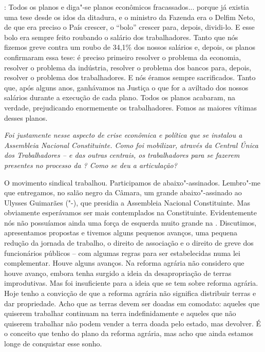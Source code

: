 : Todos os planos e diga"-se planos econômicos
fracassados... porque já existia uma tese desde os idos da ditadura, e o
ministro da Fazenda era o Delfim Neto, de que era preciso o País
crescer, o ``bolo'' crescer para, depois, dividi-lo. E esse bolo era
sempre feito roubando o salário dos trabalhadores. Tanto que nós fizemos
greve contra um roubo de 34,1\% dos nossos salários e, depois, os planos
confirmaram essa tese: é preciso primeiro resolver o problema da
economia, resolver o problema da indústria, resolver o problema dos
bancos para, depois, resolver o problema dos trabalhadores. E nós éramos
sempre sacrificados. Tanto que, após alguns anos, ganhávamos na Justiça
o que for a aviltado dos nossos salários durante a execução de cada
plano. Todos os planos acabaram, na verdade, prejudicando enormemente os
trabalhadores. Fomos as maiores vítimas desses planos.

\medskip

\noindent\emph{Foi justamente nesse aspecto de crise econômica e política que
se instalou a Assembleia Nacional Constituinte. Como foi mobilizar,
através da Central Única dos Trabalhadores --  e das outras centrais,
os trabalhadores para se fazerem presentes no processo da ? Como se
deu a articulação?}

O movimento sindical trabalhou. Participamos de
abaixo"-assinados. Lembro"-me que entregamos, no salão negro da Câmara, um
grande abaixo"-assinado ao Ulysses Guimarães ("-), que presidia a
Assembleia Nacional Constituinte. Mas obviamente esperávamos ser mais
contemplados na Constituinte. Evidentemente nós não possuíamos ainda uma
força de esquerda muito grande na . Discutimos, apresentamos
propostas e tivemos alguns pequenos avanços, uma pequena redução da
jornada de trabalho, o direito de associação e o direito de greve dos
funcionários públicos -- com algumas regras para ser estabelecidas numa
lei complementar. Houve alguns avanços. Na reforma agrária não considero
que houve avanço, embora tenha surgido a ideia da desapropriação de
terras improdutivas. Mas foi insuficiente para a ideia que se tem sobre
reforma agrária. Hoje tenho a convicção de que a reforma agrária não
significa distribuir terras e dar propriedade. Acho que as terras devem
ser doadas em comodato: aqueles que quiserem trabalhar continuam na
terra indefinidamente e aqueles que não quiserem trabalhar não podem
vender a terra doada pelo estado, mas devolver. É o conceito que tenho
do plano da reforma agrária, mas acho que ainda estamos longe de
conquistar esse sonho.

